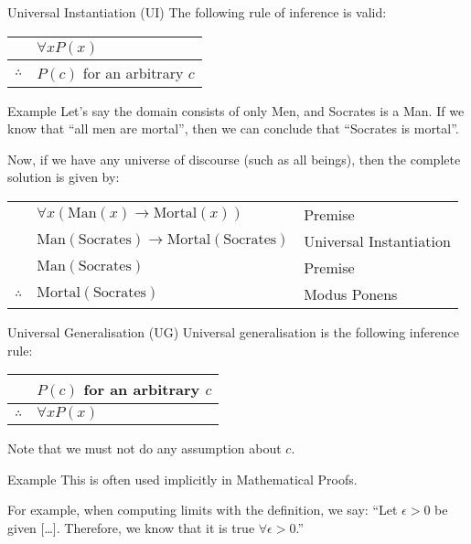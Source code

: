 \documentclass{article}
\begin{document}
\begin{parag}{Universal Instantiation (UI)}
    The following rule of inference is valid:
    \begin{center}
    \begin{tabular}{rl}
        & $\forall x P\left(x\right)$ \\
        \hline
        $\therefore$ & $P\left(c\right)$ for an arbitrary $c$
    \end{tabular}
    \end{center}

    \begin{subparag}{Example}
        Let's say the domain consists of only Men, and Socrates is a Man. If we know that ``all men are mortal'', then we can conclude that ``Socrates is mortal''.

        Now, if we have any universe of discourse (such as all beings), then the complete solution is given by:
        \begin{center}
        \begin{tabular}{rll}
            & $\forall x\left(\text{Man}\left(x\right) \to \text{Mortal}\left(x\right)\right)$ & Premise \\
            & $\text{Man}\left(\text{Socrates}\right) \to \text{Mortal}\left(\text{Socrates}\right)$ & Universal Instantiation \\
            & $\text{Man}\left(\text{Socrates}\right)$ & Premise \\
            \hline
            $\therefore$ & $\text{Mortal}\left(\text{Socrates}\right)$ & Modus Ponens
        \end{tabular}
        \end{center}
    \end{subparag}
\end{parag}

\begin{parag}{Universal Generalisation (UG)}
    Universal generalisation is the following inference rule:
    \begin{center}
    \begin{tabular}{rl}
        & $P\left(c\right)$ for an arbitrary $c$ \\
        \hline
        $\therefore$ & $\forall x P\left(x\right)$
    \end{tabular}
    \end{center}

    Note that we must not do any assumption about $c$.

    \begin{subparag}{Example}
        This is often used implicitly in Mathematical Proofs.

        For example, when computing limits with the definition, we say: ``Let $\epsilon > 0$ be given [\ldots]. Therefore, we know that it is true $\forall \epsilon > 0$.''
    \end{subparag}
\end{parag}
\end{document}
